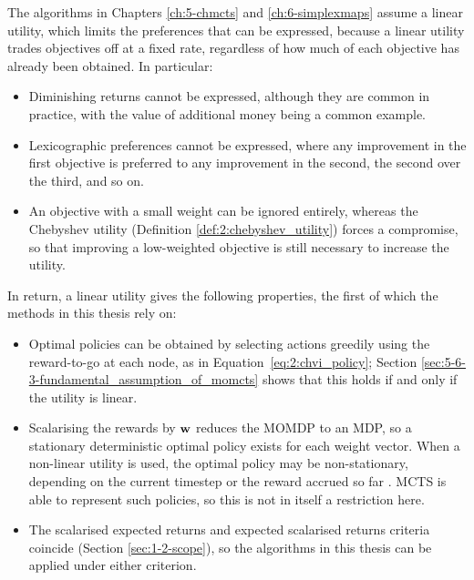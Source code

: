     The algorithms in Chapters \ref{ch:5-chmcts} and \ref{ch:6-simplexmaps} assume a linear utility, which limits the preferences that can be expressed, because a linear utility trades objectives off at a fixed rate, regardless of how much of each objective has already been obtained. In particular:
    \begin{itemize}
        \item Diminishing returns cannot be expressed, although they are common in practice, with the value of additional money being a common example.
        \item Lexicographic preferences cannot be expressed, where any improvement in the first objective is preferred to any improvement in the second, the second over the third, and so on.
        \item An objective with a small weight can be ignored entirely, whereas the Chebyshev utility (Definition \ref{def:2:chebyshev_utility}) forces a compromise, so that improving a low-weighted objective is still necessary to increase the utility.
    \end{itemize}

    In return, a linear utility gives the following properties, the first of which the methods in this thesis rely on:
    \begin{itemize}
        \item Optimal policies can be obtained by selecting actions greedily using the reward-to-go at each node, as in Equation~\eqref{eq:2:chvi_policy}; Section \ref{sec:5-6-3-fundamental_assumption_of_momcts} shows that this holds if and only if the utility is linear.
        \item Scalarising the rewards by $\mathbf{w}$ reduces the MOMDP to an MDP, so a stationary deterministic optimal policy exists for each weight vector. When a non-linear utility is used, the optimal policy may be non-stationary, depending on the current timestep or the reward accrued so far \cite{white_momdp}. MCTS is able to represent such policies, so this is not in itself a restriction here.
        \item The scalarised expected returns and expected scalarised returns criteria coincide (Section \ref{sec:1-2-scope}), so the algorithms in this thesis can be applied under either criterion.
    \end{itemize}





